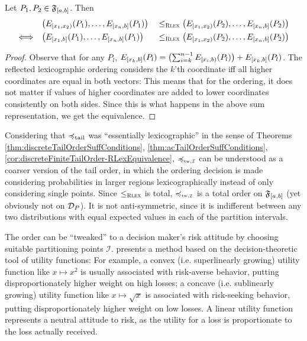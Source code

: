 \documentclass[a4paper]{scrreprt}
\begin{document}
    \begin{lemma}
        Let $P_1, P_2 \in \mathfrak{F}_{[a, b]}$.
        Then
        \begin{alignat*}{3}
                                     &\bigl(E_{[x_1, x_2)}(P_{1}), \dots, E_{[x_n, b]}(P_1)\bigr)\; &\leq_{\textsc{Rlex}} \bigl(E_{[x_1, x_2)}(P_2), \dots, E_{[x_n, b]}(P_2)\bigr) \\
            \Longleftrightarrow\quad &\bigl(E_{[x_1, b]}(P_{1}), \dots, E_{[x_n, b]}(P_1)\bigr) &\leq_{\textsc{Rlex}} \bigl(E_{[x_1, x_2)}(P_2), \dots, E_{[x_n, b]}(P_2)\bigr)
        \end{alignat*}
    \end{lemma}
    \begin{proof}
        Observe that for any $P_l$, $E_{[x_k, b]}(P_l) = \bigl(\sum_{i=k}^{n-1} E_{[x_i, b)}(P_l)\bigr) + E_{[x_k, b]}(P_l)$.
        The reflected lexicographic ordering considers the $k$'th coordinate iff all higher coordinates are equal in both vectors:
        This means that for the ordering, it does not matter if values of higher coordinates are added to lower coordinates consistently on both sides.
        Since this is what happens in the above sum representation, we get the equivalence.
    \end{proof}

    Considering that $\preccurlyeq_{\text{tail}}$ was “essentially lexicographic” in the sense of Theorems \ref{thm:discreteTailOrderSuffConditions}, \ref{thm:acTailOrderSuffConditions}, \ref{cor:discreteFiniteTailOrder-RLexEquivalence},
    $\leqtw$ can be understood as a coarser version of the tail order, in which the ordering decision is made considering probabilities in larger regions lexicographically instead of only considering single points.
    Since $\leq_{\textsc{Rlex}}$ is total, $\leqtw$ is a total order on $\mathfrak{F}_{[a, b]}$ (yet obviously not on $\mathcal{D}_P$). It is not anti-symmetric, since it is indifferent between any two distributions with equal expected values in each of the partition intervals.
    
    The order can be “tweaked” to a decision maker's risk attitude by choosing suitable partitioning points $\mathcal{I}$. \cite{bib:tweakableStochasticOrders} presents a method based on the decision-theoretic tool of utility functions: For example, a convex (i.e. superlinearly growing) utility function like $x \mapsto x^2$ is usually associated with risk-averse behavior, putting disproportionately higher weight on high losses; a concave (i.e. sublinearly growing) utility function like $x \mapsto \sqrt{x}$ is associated with risk-seeking behavior, putting disproportionately higher weight on low losses. A linear utility function represents a neutral attitude to risk, as the utility for a loss is proportionate to the loss actually received.
    
\end{document}
